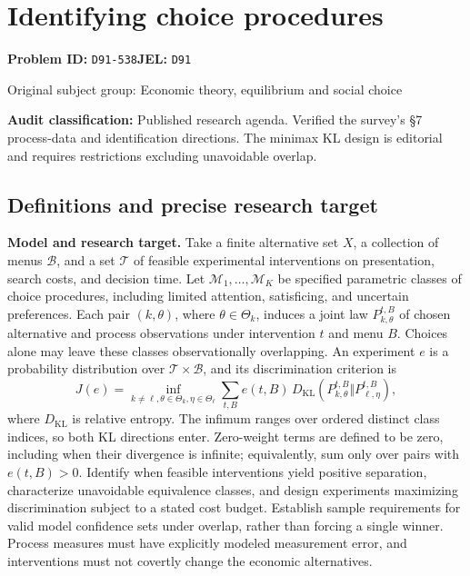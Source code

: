 \documentclass[11pt,a4paper]{article}
\begin{document}
\section*{Identifying choice procedures}
\textbf{Problem ID:} \texttt{D91-538}\quad \textbf{JEL:} \texttt{D91}\par
\label{problem:OP-0274}
{\sffamily\small\color{muted}Original subject group: Economic theory, equilibrium and social choice\par}
\label{definitions:problem:30007555}
\textbf{Audit classification:} Published research agenda. Verified the survey’s §7 process-data and identification directions. The minimax KL design is editorial and requires restrictions excluding unavoidable overlap.
\subsection*{Definitions and precise research target}
\textbf{Model and research target.} Take a finite alternative set \(X\), a collection of menus \(\mathcal B\), and a set \(\mathcal T\) of feasible experimental interventions on presentation, search costs, and decision time. Let \(\mathcal M_1,\ldots,\mathcal M_K\) be specified parametric classes of choice procedures, including limited attention, satisficing, and uncertain preferences. Each pair \((k,\theta)\), where \(\theta\in\Theta_k\), induces a joint law \(P_{k,\theta}^{t,B}\) of chosen alternative and process observations under intervention \(t\) and menu \(B\). Choices alone may leave these classes observationally overlapping. An experiment \(e\) is a probability distribution over \(\mathcal T\times\mathcal B\), and its discrimination criterion is
\[
 J(e)=\inf_{k\ne\ell,\theta\in\Theta_k,\eta\in\Theta_\ell}
 \sum_{t,B}e(t,B)\,D_{\mathrm{KL}}(P_{k,\theta}^{t,B}\Vert P_{\ell,\eta}^{t,B}),
\]
where \(D_{\mathrm{KL}}\) is relative entropy. The infimum ranges over ordered distinct class indices, so both KL directions enter. Zero-weight terms are defined to be zero, including when their divergence is infinite; equivalently, sum only over pairs with \(e(t,B)>0\). Identify when feasible interventions yield positive separation, characterize unavoidable equivalence classes, and design experiments maximizing discrimination subject to a stated cost budget. Establish sample requirements for valid model confidence sets under overlap, rather than forcing a single winner. Process measures must have explicitly modeled measurement error, and interventions must not covertly change the economic alternatives.
\end{document}
